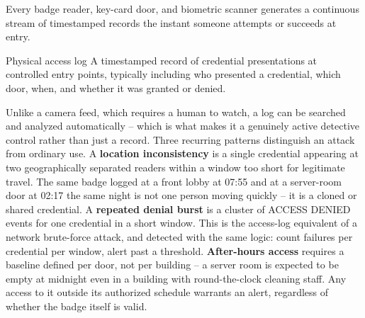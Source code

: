 Every badge reader, key-card door, and biometric scanner generates a continuous stream of
timestamped records the instant someone attempts or succeeds at entry.

\begin{definition}{Physical access log}
A timestamped record of credential presentations at controlled entry points, typically including
who presented a credential, which door, when, and whether it was granted or denied.
\end{definition}

Unlike a camera feed, which requires a human to watch, a log can be searched and analyzed
automatically -- which is what makes it a genuinely active detective control rather than just a
record. Three recurring patterns distinguish an attack from ordinary use. A \textbf{location
inconsistency} is a single credential appearing at two geographically separated readers within a
window too short for legitimate travel. The same badge logged at a front lobby at 07:55 and at a
server-room door at 02:17 the same night is not one person moving quickly -- it is a cloned or
shared credential. A \textbf{repeated denial burst} is a cluster of ACCESS DENIED events for one
credential in a short window. This is the access-log equivalent of a network brute-force attack, and
detected with the same logic: count failures per credential per window, alert past a threshold.
\textbf{After-hours access} requires a baseline defined per door, not per building -- a server
room is expected to be empty at midnight even in a building with round-the-clock cleaning staff.
Any access to it outside its authorized schedule warrants an alert, regardless of whether the
badge itself is valid.

